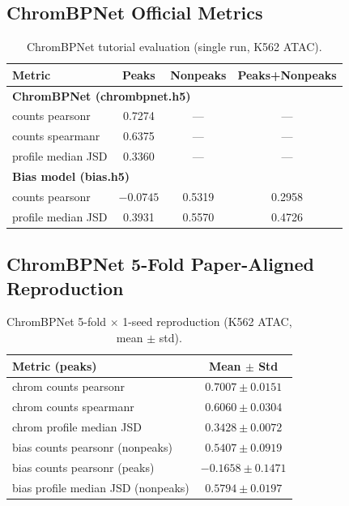 \documentclass[11pt,a4paper]{article}
\begin{document}
\subsection{ChromBPNet Official Metrics}

\begin{table}[h]
\centering
\caption{ChromBPNet tutorial evaluation (single run, K562 ATAC).}
\label{tab:chrombpnet}
\small
\begin{tabular}{l c c c}
\toprule
\textbf{Metric} & \textbf{Peaks} & \textbf{Nonpeaks} & \textbf{Peaks+Nonpeaks} \\
\midrule
\multicolumn{4}{l}{\textbf{ChromBPNet (chrombpnet.h5)}} \\
\quad counts pearsonr & 0.7274 & --- & --- \\
\quad counts spearmanr & 0.6375 & --- & --- \\
\quad profile median JSD & 0.3360 & --- & --- \\
\midrule
\multicolumn{4}{l}{\textbf{Bias model (bias.h5)}} \\
\quad counts pearsonr & $-0.0745$ & 0.5319 & 0.2958 \\
\quad profile median JSD & 0.3931 & 0.5570 & 0.4726 \\
\bottomrule
\end{tabular}
\end{table}

\subsection{ChromBPNet 5-Fold Paper-Aligned Reproduction}

\begin{table}[h]
\centering
\caption{ChromBPNet 5-fold $\times$ 1-seed reproduction (K562 ATAC, mean $\pm$ std).}
\label{tab:chrombpnet_5fold}
\small
\begin{tabular}{l c}
\toprule
\textbf{Metric (peaks)} & \textbf{Mean $\pm$ Std} \\
\midrule
chrom counts pearsonr & $0.7007 \pm 0.0151$ \\
chrom counts spearmanr & $0.6060 \pm 0.0304$ \\
chrom profile median JSD & $0.3428 \pm 0.0072$ \\
\midrule
bias counts pearsonr (nonpeaks) & $0.5407 \pm 0.0919$ \\
bias counts pearsonr (peaks) & $-0.1658 \pm 0.1471$ \\
bias profile median JSD (nonpeaks) & $0.5794 \pm 0.0197$ \\
\bottomrule
\end{tabular}
\end{table}
\end{document}
